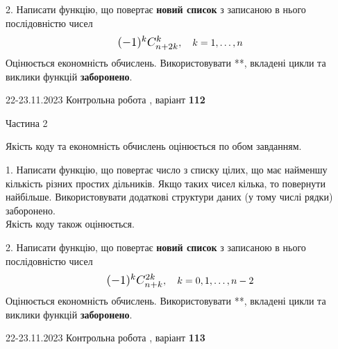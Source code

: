 \documentclass[12pt, ukrainian]{article}
\begin{document}
{{{{{{{{{{{\begin {Large}
\vspace{10mm}



2. 
Написати функцію, що повертає \textbf{новий список} з записаною в нього послідовністю чисел
$$\scalebox{1.2}{$(-1)^{k}C_{n+2k}^{k}$}, \quad k=1,\ldots,n$$
Оцінюється економність обчислень. Використовувати **, вкладені цикли та виклики функцій \textbf{заборонено}.

\end{Large}\newpage




\begin {Huge}
{{22-23.11.2023 Контрольна робота , варіант  \No \textbf { 112 }\par}}

\begin{center}Частина 2
\end{center}
\vspace{10mm}
\end {Huge}

{
\begin {Large}
Якість коду та економність обчислень оцінюється по обом завданням.

\vspace{5mm}

1. Написати функцію, що повертає число з списку цілих, що має найменшу кількість різних простих дільників. Якщо таких чисел кілька, то повернути найбільше. Використовувати додаткові структури даних (у тому числі рядки) заборонено.\\	Якість коду також оцінюється. 



\vspace{10mm}



2. 
Написати функцію, що повертає \textbf{новий список} з записаною в нього послідовністю чисел
$$\scalebox{1.2}{$(-1)^{k}C_{n+k}^{2k}$}, \quad k=0,1,\ldots,n-2$$
Оцінюється економність обчислень. Використовувати **, вкладені цикли та виклики функцій \textbf{заборонено}.

\end{Large}\newpage




\begin {Huge}
{{22-23.11.2023 Контрольна робота , варіант  \No \textbf { 113 }\par}}


\end{Huge}}}}}}}}}}}}}
\end{document}
